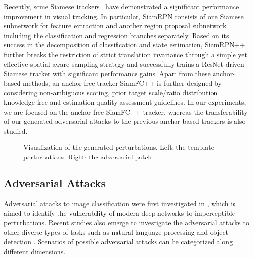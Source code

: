 \documentclass[journal]{IEEEtran}
\begin{document}
Recently, some Siamese trackers~\cite{SiamRPN,SiamRPN++,SiamFC++} have demonstrated a significant performance improvement in visual tracking. 
In particular, SiamRPN \cite{SiamRPN} consists of one Siamese subnetwork for feature extraction and another region proposal subnetwork including the classification and regression branches separately. Based on its success in the decomposition of classification and state estimation, SiamRPN++ \cite{SiamRPN++} further breaks the restriction of strict translation invariance through a simple yet effective spatial aware sampling strategy and successfully trains a ResNet-driven Siamese tracker with significant performance gains. Apart from these anchor-based methods, an anchor-free tracker SiamFC++ \cite{SiamFC++} is further designed by considering non-ambiguous scoring, prior target scale/ratio distribution knowledge-free and estimation quality assessment guidelines.
In our experiments, we are focused on the anchor-free SiamFC++ tracker, whereas the transferability of our generated adversarial attacks to the previous anchor-based trackers is also studied.

\begin{figure}[t]
  \centering
   \qquad
  \caption{Visualization of the generated perturbations. Left: the template perturbations. Right: the adversarial patch.}
  \label{fig:vis_perturbations}
\end{figure}

\subsection{Adversarial Attacks}

Adversarial attacks to image classification were first investigated in \cite{intriguing}, which is aimed to identify the vulnerability of modern deep networks to imperceptible perturbations. 
Recent studies also emerge to investigate the adversarial attacks to other diverse types of tasks such as natural language processing \cite{generating} and object detection \cite{wei2019transferable}.
Scenarios of possible adversarial attacks can be categorized along different dimensions.
\end{document}

